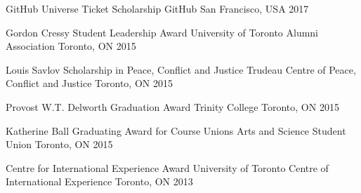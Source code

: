 



\begin{cvhonors}

  \cvhonor
    {GitHub Universe Ticket Scholarship} %
    {GitHub} %
    {San Francisco, USA} %
    {2017} %

  \cvhonor
    {Gordon Cressy Student Leadership Award} %
    {University of Toronto Alumni Association} %
    {Toronto, ON} %
    {2015} %

  \cvhonor
    {Louis Savlov Scholarship in Peace, Conflict and Justice} %
    {Trudeau Centre of Peace, Conflict and Justice} %
    {Toronto, ON} %
    {2015} %

  \cvhonor
    {Provost W.T. Delworth Graduation Award} %
    {Trinity College} %
    {Toronto, ON} %
    {2015} %

  \cvhonor
    {Katherine Ball Graduating Award for Course Unions} %
    {Arts and Science Student Union} %
    {Toronto, ON} %
    {2015} %

  \cvhonor
    {Centre for International Experience Award} %
    {University of Toronto Centre of International Experience } %
    {Toronto, ON} %
    {2013} %


        
\end{cvhonors}





